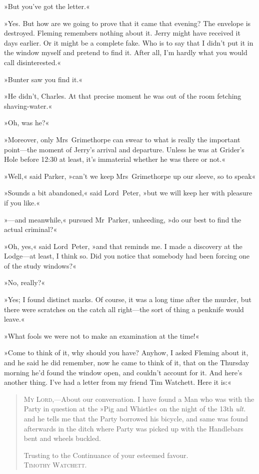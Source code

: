 »But you've got the letter.«

»Yes. But how are we going to prove that it came that evening? The envelope is destroyed. Fleming remembers nothing about it. Jerry might have received it days earlier. Or it might be a complete fake. Who is to say that I didn't put it in the window myself and pretend to find it. After all, I'm hardly what you would call disinterested.«

»Bunter saw you find it.«

»He didn't, Charles. At that precise moment he was out of the room fetching shaving-water.«

»Oh, was he?«

»Moreover, only Mrs~Grimethorpe can swear to what is really the important point—the moment of Jerry's arrival and departure. Unless he was at Grider's Hole before 12:30 at least, it's immaterial whether he was there or not.«

»Well,« said Parker, »can't we keep Mrs~Grimethorpe up our sleeve, so to speak\longdash«

»Sounds a bit abandoned,« said Lord~Peter, »but we will keep her with pleasure if you like.«

»—and meanwhile,« pursued Mr~Parker, unheeding, »do our best to find the actual criminal?«

»Oh, yes,« said Lord~Peter, »and that reminds me. I made a discovery at the Lodge—at least, I think so. Did you notice that somebody had been forcing one of the study windows?«

»No, really?«

»Yes; I found distinct marks. Of course, it was a long time after the murder, but there were scratches on the catch all right—the sort of thing a penknife would leave.«

»What fools we were not to make an examination at the time!«

»Come to think of it, why should you have? Anyhow, I asked Fleming about it, and he said he did remember, now he came to think of it, that on the Thursday morning he'd found the window open, and couldn't account for it. And here's another thing. I've had a letter from my friend Tim Watchett. Here it is:«

\begin{quote}
\textsc{My Lord},—About our conversation. I have found a Man who was with the Party in question at the »Pig and Whistle« on the night of the 13th \textit{ult.} and he tells me that the Party borrowed his bicycle, and same was found afterwards in the ditch where Party was picked up with the Handlebars bent and wheels buckled.

\begin{flushright}
Trusting to the Continuance of your esteemed favour.\\
\textsc{Timothy Watchett.}
\end{flushright}
\end{quote}

